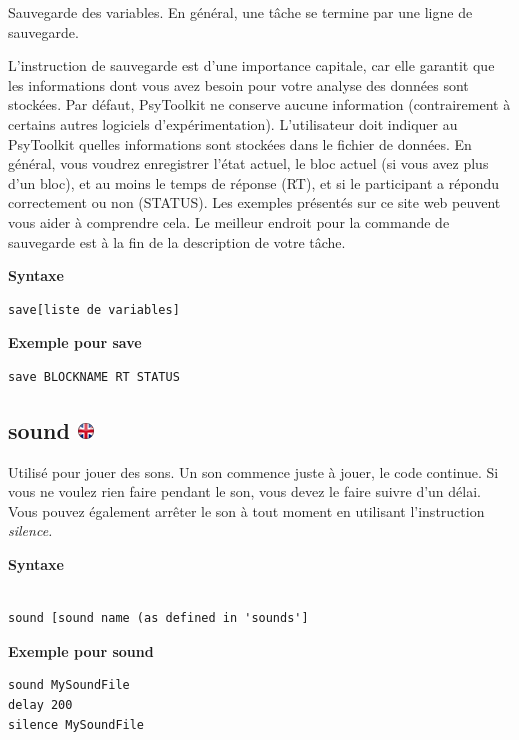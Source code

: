 \documentclass[
]{book}
\begin{document}
Sauvegarde des variables. En général, une tâche se termine par une ligne de sauvegarde.

L'instruction de sauvegarde est d'une importance capitale, car elle garantit que les informations dont vous avez besoin pour votre analyse des données sont stockées. Par défaut, PsyToolkit ne conserve aucune information (contrairement à certains autres logiciels d'expérimentation). L'utilisateur doit indiquer au PsyToolkit quelles informations sont stockées dans le fichier de données.
En général, vous voudrez enregistrer l'état actuel, le bloc actuel (si vous avez plus d'un bloc), et au moins le temps de réponse (RT), et si le participant a répondu correctement ou non (STATUS). Les exemples présentés sur ce site web peuvent vous aider à comprendre cela.
Le meilleur endroit pour la commande de sauvegarde est à la fin de la description de votre tâche.

\textbf{Syntaxe}

\begin{verbatim}
save[liste de variables]
\end{verbatim}

\textbf{Exemple pour save}

\begin{verbatim}
save BLOCKNAME RT STATUS
\end{verbatim}

\hypertarget{sound}{%
\subsection[sound ]{\texorpdfstring{sound \href{https://www.psytoolkit.org/doc3.2.0/syntax.html\#task-sound}{\protect\includegraphics{img/ukflag.png}}}{sound }}\label{sound}}

Utilisé pour jouer des sons. Un son commence juste à jouer, le code continue. Si vous ne voulez rien faire pendant le son, vous devez le faire suivre d'un délai. Vous pouvez également arrêter le son à tout moment en utilisant l'instruction \emph{silence.}

\textbf{Syntaxe}

\begin{verbatim}

sound [sound name (as defined in 'sounds']
\end{verbatim}

\textbf{Exemple pour sound}

\begin{verbatim}
sound MySoundFile
delay 200
silence MySoundFile
\end{verbatim}
\end{document}
